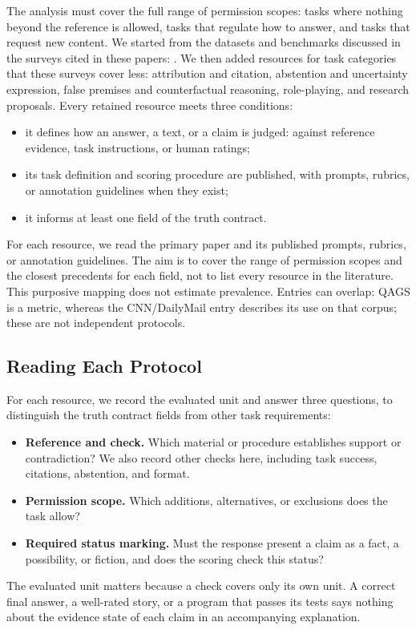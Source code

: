 \documentclass{clv2025}
\begin{document}
The analysis must cover the full range of permission scopes: tasks where
nothing beyond the reference is allowed, tasks that regulate how to answer,
and tasks that request new content. We started from the datasets and
benchmarks discussed in the surveys cited in these papers:
\citep{ji_survey_2023,huang_survey_2025,jiang_survey_2024,
franceschelli_creativity_2024}. We then added resources for task
categories that these surveys cover less: attribution and citation,
abstention and uncertainty expression, false premises and counterfactual
reasoning, role-playing, and research proposals. Every retained resource
meets three conditions:
\begin{itemize}
\item it defines how an answer, a text, or a claim is judged: against
reference evidence, task instructions, or human ratings;
\item its task definition and scoring procedure are published, with
prompts, rubrics, or annotation guidelines when they exist;
\item it informs at least one field of the truth contract.
\end{itemize}
For each resource, we read the primary paper and its published prompts,
rubrics, or annotation guidelines. The aim is to cover the range of
permission scopes and the closest precedents for each field, not to list
every resource in the literature. This purposive mapping does not estimate
prevalence. Entries can overlap: QAGS is a metric, whereas the CNN/DailyMail
entry describes its use on that corpus; these are not independent protocols.

\subsection{Reading Each Protocol}\label{subsec:criteria}

For each resource, we record the evaluated unit and answer three questions,
to distinguish the truth contract fields from other task requirements:
\begin{itemize}
\item \textbf{Reference and check.} Which material or procedure establishes
support or contradiction? We also record other checks here, including
task success, citations, abstention, and format.
\item \textbf{Permission scope.} Which additions, alternatives, or
exclusions does the task allow?
\item \textbf{Required status marking.} Must the response present a claim
as a fact, a possibility, or fiction, and does the scoring check this status?
\end{itemize}
The evaluated unit matters because a check covers only its own unit.
A correct final answer, a well-rated story, or a program that passes its
tests says nothing about the evidence state of each claim in an
accompanying explanation.
\end{document}
